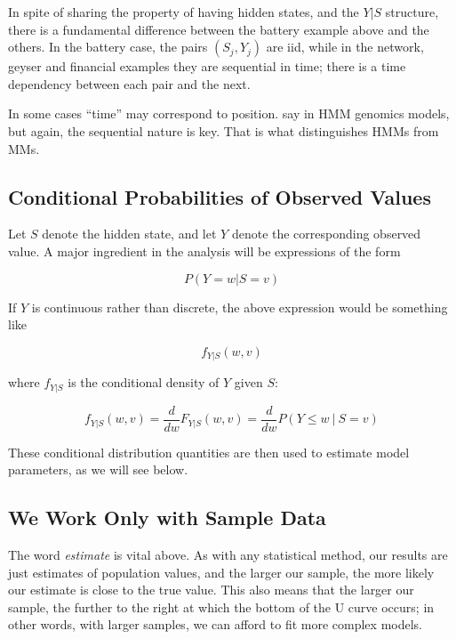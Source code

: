 \documentclass[11pt]{article}
\begin{document}
In spite of sharing the property of having hidden states, and the $Y|S$
structure, there is a fundamental difference between the battery example
above and the others.  In the battery case, the pairs $(S_j,Y_j)$ are
iid, while in the network, geyser and financial examples they are
sequential in time; there is a time dependency between each pair and the
next.  

In some cases ``time'' may correspond to position. say in HMM genomics
models, but again, the sequential nature is key.  That is what
distinguishes HMMs from MMs.

\subsection{Conditional Probabilities of Observed Values}

Let $S$ denote the hidden state, and let $Y$ denote the corresponding
observed value.  A major ingredient in the analysis will be expressions of
the form

\begin{equation}
P(Y = w | S  = v)
\end{equation}

If $Y$ is continuous rather than discrete, the above expression would be
something like

\begin{equation}
f_{Y|S} (w,v) 
\end{equation}

where $f_{Y|S}$ is the conditional density of $Y$ given $S$:

\begin{equation}
f_{Y|S}(w,v) 
= \frac{d}{dw} F_{Y|S}(w,v) 
= \frac{d}{dw} P(Y \leq w ~|~ S = v)
\end{equation}

These conditional distribution quantities are then used to estimate
model parameters, as we will see below.

\subsection{We Work Only with Sample Data}

The word \textit{estimate} is vital above.  As with any statistical
method, our results are just estimates of population values, and the
larger our sample, the more likely our estimate is close to the true
value.  This also means that the larger our sample, the further to the
right at which the bottom of the U curve occurs; in other words, with
larger samples, we can afford to fit more complex models.
\end{document}
